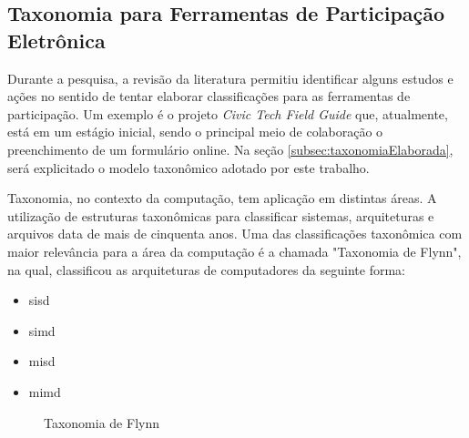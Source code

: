 \subsection{Taxonomia para Ferramentas de Participação Eletrônica}
\label{subsec:taxonomia e-part tools}
\par
Durante a pesquisa, a revisão da literatura permitiu identificar alguns estudos e ações no sentido de tentar elaborar classificações para as ferramentas de participação.
Um exemplo é o projeto \textit{Civic Tech Field Guide} que, atualmente, está em um estágio inicial, sendo o principal meio de colaboração o preenchimento de um formulário online.
Na seção \ref{subsec:taxonomiaElaborada}, será explicitado o modelo taxonômico adotado por este trabalho.

\par
Taxonomia, no contexto da computação, tem aplicação em distintas áreas. A utilização de estruturas taxonômicas para classificar sistemas, arquiteturas e arquivos data de mais de
cinquenta anos. Uma das classificações taxonômica com maior relevância para a área da computação é a chamada "Taxonomia de Flynn",
na qual,  classificou as arquiteturas de computadores da seguinte forma:\\

\begin{minipage}{.66\textwidth}
    \begin{singlespace}
        \begin{itemize}
            \item \acrfull{sisd}
            \item \acrfull{simd}
            \item \acrfull{misd}
            \item \acrfull{mimd}
        \end{itemize}
    \end{singlespace}
\end{minipage}
\vspace{0.5cm}

\begin{figure}[!ht]
    \caption{Taxonomia de Flynn}
    \label{fig:taxonomiaFlynn}  
\end{figure}

